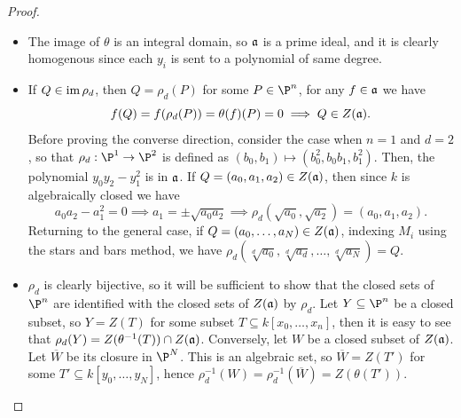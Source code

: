 \documentclass[a4paper]{article}
\begin{document}
\begin{enumerate} [label=\textbf{\arabic*.}, leftmargin=0cm]
          \begin{proof} $ $ \vspace{0pt}
              \begin{itemize} [leftmargin=0cm]
                  \item[(a)] The image of $\theta$ is an integral domain, so $\mathfrak{a}$ is a prime ideal, and it is clearly homogenous since each $y_i$ is sent to a polynomial of same degree.

                  \item[(b)] If $Q \in \operatorname{im}{\rho_d}$, then $Q = \rho_d(P)$ for some $P \in \P^n$, for any $f \in \mathfrak{a}$ we have
                        \begin{equation*}
                            f(Q) = f(\rho_d(P)) = \theta(f)(P) = 0 \implies Q \in Z(\mathfrak{a}).
                        \end{equation*}
                        Before proving the converse direction, consider the case when $n = 1$ and $d = 2$, so that $\rho_d : \P^1 \to \P^2$ is defined as $(b_0, b_1) \mapsto (b_0^2, b_0 b_1, b_1^2)$. Then, the polynomial $y_0 y_2 - y_1^2$ is in $\mathfrak{a}$. If $Q = (a_0, a_1, a_2) \in Z(\mathfrak{a})$, then since $k$ is algebraically closed we have
                        \begin{equation*}
                            a_0 a_2 - a_1^2 = 0 \implies a_1 = \pm \sqrt{a_0 a_2} \implies \rho_d(\sqrt{a_0}, \sqrt{a_2}) = (a_0, a_1, a_2).
                        \end{equation*}
                        Returning to the general case, if $Q = (a_0, \dots, a_N) \in Z(\mathfrak{a})$, indexing $M_i$ using the stars and bars method, we have $\rho_d(\sqrt[d]{a_0}, \sqrt[d]{a_d}, \dots, \sqrt[d]{a_N}) = Q$.

                  \item[(c)] $\rho_d$ is clearly bijective, so it will be sufficient to show that the closed sets of $\P^n$ are identified with the closed sets of $Z(\mathfrak{a})$ by $\rho_d$. Let $Y \subseteq \P^n$ be a closed subset, so $Y = Z(T)$ for some subset $T \subseteq k[x_0, \dots, x_n]$, then it is easy to see that $\rho_d(Y) = Z(\theta^{-1}(T)) \cap Z(\mathfrak{a})$. Conversely, let $W$ be a closed subset of $Z(\mathfrak{a})$. Let $\overline{W}$ be its closure in $\P^N$. This is an algebraic set, so $\overline{W} = Z(T')$ for some $T' \subseteq k[y_0, \dots, y_N]$, hence $\rho_d^{-1}(W) = \rho_d^{-1}(\overline{W}) = Z(\theta(T'))$.


\end{itemize}
\end{proof}
\end{enumerate}
\end{document}
